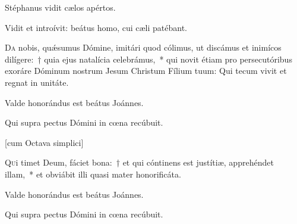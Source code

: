 \documentclass[vesperale_romanum.tex]{subfiles}
\begin{document}

\vv Stéphanus vidit cælos apértos.

\rr Vidit et introívit: beátus homo, cui cæli patébant.

\admagnificat


\oratio \label{oratio_s_stephani_dec_26}

\lettrine{D}{a} nobis, quǽsumus Dómine, imitári quod cólimus, ut discámus et inimícos dilígere:~† quia ejus natalícia celebrámus,~* qui novit étiam pro persecutóribus exoráre Dóminum nostrum Jesum Christum Fílium tuum: Qui tecum vivit et regnat in unitáte.



\vv Valde honorándus est beátus Joánnes.

\rr Qui supra pectus Dómini in cœna recúbuit.




{} \label{dec_27}


[cum Octava simplici]


\lettrine{Q}{u}i timet Deum, fáciet bona:~† et qui cóntinens est justítiæ, apprehéndet illam,~* et obviábit illi quasi mater honorificáta.

\hymnus


\vv Valde honorándus est beátus Joánnes.

\rr Qui supra pectus Dómini in cœna recúbuit.
\end{document}
